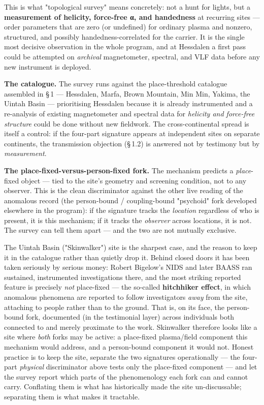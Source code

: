 \documentclass[11pt]{article}
\begin{document}
This is what "topological survey" means concretely: not a hunt for lights, but a \textbf{measurement of helicity, force-free α, and handedness} at recurring sites --- order parameters that are zero (or undefined) for ordinary plasma and nonzero, structured, and possibly handedness-correlated for the carrier. It is the single most decisive observation in the whole program, and at Hessdalen a first pass could be attempted on \emph{archival} magnetometer, spectral, and VLF data before any new instrument is deployed.

\textbf{The catalogue.} The survey runs against the place-threshold catalogue assembled in \S\,1 --- Hessdalen, Marfa, Brown Mountain, Min Min, Yakima, the Uintah Basin --- prioritising Hessdalen because it is already instrumented and a re-analysis of existing magnetometer and spectral data for \emph{helicity and force-free structure} could be done without new fieldwork. The cross-continental spread is itself a control: if the four-part signature appears at independent sites on separate continents, the transmission objection (\S\,1.2) is answered not by testimony but by \emph{measurement}.

\textbf{The place-fixed-versus-person-fixed fork.} The mechanism predicts a \emph{place}-fixed object --- tied to the site's geometry and screening condition, not to any observer. This is the clean discriminator against the other live reading of the anomalous record (the person-bound / coupling-bound "psychoid" fork developed elsewhere in the program): if the signature tracks the \emph{location} regardless of who is present, it is this mechanism; if it tracks the \emph{observer} across locations, it is not. The survey can tell them apart --- and the two are not mutually exclusive.

The Uintah Basin ("Skinwalker") site is the sharpest case, and the reason to keep it in the catalogue rather than quietly drop it. Behind closed doors it has been taken seriously by serious money: Robert Bigelow's NIDS and later BAASS ran sustained, instrumented investigations there, and the most striking reported feature is precisely \emph{not} place-fixed --- the so-called \textbf{hitchhiker effect}, in which anomalous phenomena are reported to follow investigators \emph{away} from the site, attaching to people rather than to the ground. That is, on its face, the person-bound fork, documented (in the testimonial layer) across individuals both connected to and merely proximate to the work. Skinwalker therefore looks like a site where \emph{both} forks may be active: a place-fixed plasma/field component this mechanism would address, and a person-bound component it would not. Honest practice is to keep the site, separate the two signatures operationally --- the four-part \emph{physical} discriminator above tests only the place-fixed component --- and let the survey report which parts of the phenomenology each fork can and cannot carry. Conflating them is what has historically made the site un-discussable; separating them is what makes it tractable.
\end{document}
